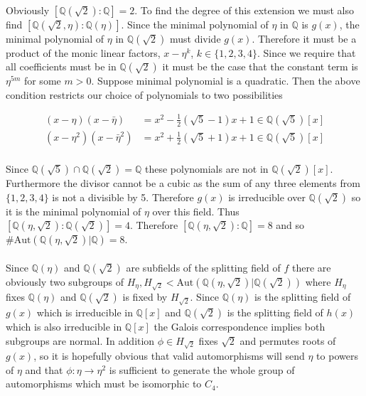 \documentclass{article}
\begin{document}
\paragraph{}
Obviously $[\mathbb{Q}(\sqrt{2}):\mathbb{Q}] = 2$. To find the degree of this extension we must 
also find $[\mathbb{Q}(\sqrt{2},\eta):\mathbb{Q}(\eta)]$. Since the minimal polynomial of $\eta$ in 
$\mathbb{Q}$ is $g(x)$, the minimal polynomial of $\eta$ in $\mathbb{Q}(\sqrt{2})$ must divide 
$g(x)$. Therefore it must be a product of the monic linear factors, $x - \eta^k$, $k \in \{1,2,3,4\}$. 
Since we require that all coefficients must be in $\mathbb{Q}(\sqrt{2})$ it must be the case that the 
constant term is $\eta^{5m}$ for some $m>0$. Suppose minimal polynomial is a quadratic. Then the 
above condition restricts our choice of polynomials to two possibilities

\begin{align*}
    (x- \eta)(x-\bar{\eta}) &= x^2 -\frac{1}{2}(\sqrt{5}-1)x + 1 \in \mathbb{Q}(\sqrt{5})[x] \\
    (x- \eta^2)(x-\bar{\eta}^2) &= x^2 + \frac{1}{2}(\sqrt{5}+1)x + 1 \in \mathbb{Q}(\sqrt{5})[x] \\
\end{align*}

Since $\mathbb{Q}(\sqrt{5}) \cap \mathbb{Q}(\sqrt{2}) = \mathbb{Q}$ these polynomials are not in $\mathbb{Q}(\sqrt{2})[x]$. Furthermore the 
divisor cannot be a cubic as the sum of any three elements from $\{1,2,3,4\}$ is not a divisible 
by 5. Therefore $g(x)$ is irreducible over $\mathbb{Q}(\sqrt{2})$ so it is the minimal polynomial 
of $\eta$ over this field. Thus $[\mathbb{Q}(\eta,\sqrt{2}):\mathbb{Q}(\sqrt{2})] = 4$. Therefore 
$[\mathbb{Q}(\eta,\sqrt{2}):\mathbb{Q}] = 8$ and so $\#\text{Aut}(\mathbb{Q}(\eta,\sqrt{2})|\mathbb{Q}) = 8$. 

\paragraph{}
Since $\mathbb{Q}(\eta)$ and $\mathbb{Q}(\sqrt{2})$ are subfields of the splitting field of $f$ 
there are obviously two subgroups of $H_\eta, H_{\sqrt{2}} <\text{Aut}(\mathbb{Q}(\eta,\sqrt{2})|\mathbb{Q}(\sqrt{2}))$ 
where $H_\eta$ fixes $\mathbb{Q}(\eta)$ and $\mathbb{Q}(\sqrt{2})$ is fixed by $H_{\sqrt{2}}$. 
Since $\mathbb{Q}(\eta)$ is the splitting field of $g(x)$ which is irreducible in $\mathbb{Q}[x]$ 
and $\mathbb{Q}(\sqrt{2})$ is the splitting field of $h(x)$ which is also irreducible in $\mathbb{Q}[x]$ 
the Galois correspondence implies both subgroups are normal. In addition  
$\phi \in H_{\sqrt{2}}$ fixes $\sqrt{2}$ and permutes roots of $g(x)$, so it is hopefully obvious 
that valid automorphisms will send $\eta$ to powers of $\eta$ and that $\phi:\eta \rightarrow \eta^2$ 
is sufficient to generate the whole group of automorphisms which must be isomorphic to $C_4$. 
\end{document}
